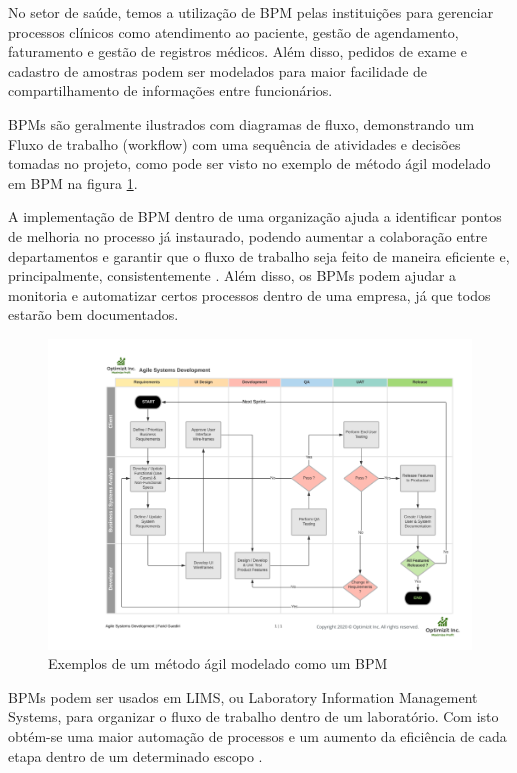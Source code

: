 

No setor de saúde, temos a utilização de BPM pelas instituições para gerenciar processos clínicos como atendimento ao paciente, gestão de agendamento, faturamento e gestão de registros médicos. Além disso, pedidos de exame e cadastro de amostras podem ser modelados para maior facilidade de compartilhamento de informações entre funcionários.


BPMs são geralmente ilustrados com diagramas de fluxo, demonstrando um Fluxo de trabalho (workflow) com uma sequência de atividades e decisões tomadas no projeto, como pode ser visto no exemplo de método ágil modelado em BPM na figura \ref{fig:bpm}.

A implementação de BPM dentro de uma organização ajuda a identificar pontos de melhoria no processo já instaurado, podendo aumentar a colaboração entre departamentos e garantir que o fluxo de trabalho seja feito de maneira eficiente e, principalmente, consistentemente \R.
Além disso, os BPMs podem ajudar a monitoria e automatizar certos processos dentro de uma empresa, já que todos estarão bem documentados. \R

\begin{figure}
    \centering
    \includegraphics[width=1\textwidth]{imgs/BPM/sprint as bpm.png}
    \caption{Exemplos de um método ágil modelado como um BPM}
    \label{fig:bpm}
\end{figure}

BPMs podem ser usados em LIMS, ou Laboratory Information Management Systems, para organizar o fluxo de trabalho dentro de um laboratório. Com isto obtém-se uma maior automação de processos e um aumento da eficiência de cada etapa dentro de um determinado escopo \cite{Key2011}.

